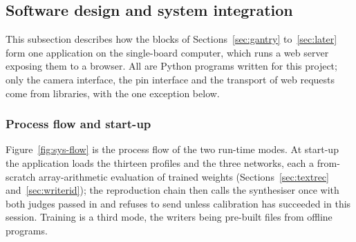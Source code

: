 \subsection{Software design and system integration}
\label{sec:system}

\begingroup
\setlength{\abovedisplayskip}{4pt}\setlength{\belowdisplayskip}{4pt}
\setlength{\abovedisplayshortskip}{2pt}\setlength{\belowdisplayshortskip}{2pt}

This subsection describes how the blocks of Sections~\ref{sec:gantry} to~\ref{sec:later} form one application on the single-board computer, which runs a web server exposing them to a browser. All are Python programs written for this project; only the camera interface, the pin interface and the transport of web requests come from libraries, with the one exception below.

\subsubsection{Process flow and start-up}

Figure~\ref{fig:sys-flow} is the process flow of the two run-time modes. At start-up the application loads the thirteen profiles and the three networks, each a from-scratch array-arithmetic evaluation of trained weights (Sections~\ref{sec:textrec} and~\ref{sec:writerid}); the reproduction chain then calls the synthesiser once with both judges passed in and refuses to send unless calibration has succeeded in this session. Training is a third mode, the writers being pre-built files from offline programs. 

